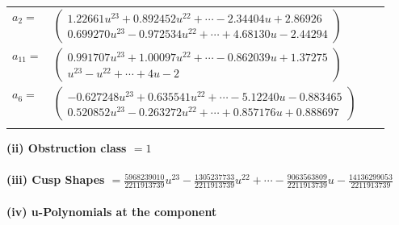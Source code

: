 \documentclass[1p]{elsarticle_modified}
\theoremstyle{definition}
\begin{document}
\begin{tabular}{m{7pt} m{180pt} m{7pt} m{180pt} }
\flushright $a_{2}=$&$\begin{pmatrix}1.22661 u^{23}+0.892452 u^{22}+\cdots-2.34404 u+2.86926\\0.699270 u^{23}-0.972534 u^{22}+\cdots+4.68130 u-2.44294\end{pmatrix}$ \\
\flushright $a_{11}=$&$\begin{pmatrix}0.991707 u^{23}+1.00097 u^{22}+\cdots-0.862039 u+1.37275\\u^{23}- u^{22}+\cdots+4 u-2\end{pmatrix}$ \\
\flushright $a_{6}=$&$\begin{pmatrix}-0.627248 u^{23}+0.635541 u^{22}+\cdots-5.12240 u-0.883465\\0.520852 u^{23}-0.263272 u^{22}+\cdots+0.857176 u+0.888697\end{pmatrix}$\\&\end{tabular}
\flushleft \textbf{(ii) Obstruction class $= 1$}\\~\\
\flushleft \textbf{(iii) Cusp Shapes $= \frac{5968239010}{2211913739} u^{23}-\frac{1305237733}{2211913739} u^{22}+\cdots-\frac{9063563809}{2211913739} u-\frac{14136299053}{2211913739}$}\\~\\
\newpage\renewcommand{\arraystretch}{1}
\flushleft \textbf{(iv) u-Polynomials at the component}\newline \\
\end{document}
